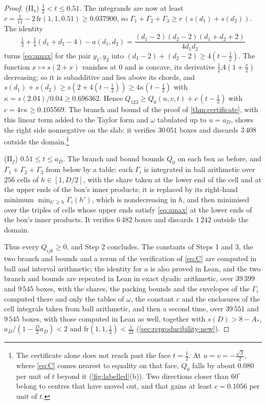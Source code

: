 \documentclass[11pt,reqno]{amsart}
\renewcommand{\_}{\origunderscore\allowbreak}
\numberwithin{equation}{section}
\theoremstyle{plain}
\theoremstyle{definition}
\theoremstyle{remark}
\begin{document}
\begin{proof}
(II$_s$) $\frac12<t\le0.51$. The integrands are now at least
$r=\frac1{11}-2\,\mathrm{fr}(1,1,0.51)\ge0.037900$, so
$\Gamma_1+\Gamma_2+\Gamma_3\ge r\,(s(d_1)+s(d_2))$. The identity
\[
  \tfrac12+\tfrac14(d_1+d_2-4)-a(d_1,d_2)
  =\frac{(d_1-2)(d_2-2)(d_1+d_2+2)}{4d_1d_2}
\]
turns \eqref{eq:amax} for the pair $y_1,y_2$ into
$(d_1-2)+(d_2-2)\ge4(t-\frac12)$. The function $x\mapsto s(2+x)$
vanishes at $0$ and is concave, its derivative $\frac12A(1+\frac x2)$
decreasing; so it is subadditive and lies above its chords, and
$s(d_1)+s(d_2)\ge s(2+4(t-\frac12))\ge4\kappa(t-\frac12)$ with
$\kappa=s(2.04)/0.04\ge0.696362$. Hence
$Q_{123}\ge Q_0(u,v,t)+c\,(t-\frac12)$ with $c=4r\kappa\ge0.105569$. The
branch and bound of the proof of \cref{thm:certificate}, with this linear
term added to the Taylor form and $\omega$ tabulated up to $u=a_D$, shows
the right side nonnegative on the slab: it verifies $30\,051$ boxes and
discards $3\,408$ outside the domain.\footnote{The certificate alone
does not reach past the face $t=\frac12$. At $u=v=-\frac{\sqrt3}2$, where
\eqref{eq:C} comes nearest to equality on that face, $Q_0$ falls by
about $0.080$ per unit of $t$ beyond it (\cref{fig:labelled}(b)). Two
directions closer than $60^\circ$ belong to centres that have moved out,
and that gains at least $c=0.1056$ per unit of $t$.}

(II$_f$) $0.51\le t\le a_D$. The branch and bound bounds $Q_0$ on each
box as before, and $\Gamma_1+\Gamma_2+\Gamma_3$ from below by a table:
each $\Gamma_i$ is integrated in ball arithmetic over $256$ cells of
$h\in[1,D/2]$, with the share taken at the lower end of the cell and at
the upper ends of the box's inner products; it is replaced by its
right-hand minimum $\min_{h'\ge h}\Gamma_i(h')$, which is nondecreasing
in $h$, and then minimised over the triples of cells whose upper ends
satisfy \eqref{eq:amax} at the lower ends of the box's inner products.
It verifies $6\,482$ boxes and discards $1\,242$ outside the domain.

Thus every $Q_{ijk}\ge0$, and Step 2 concludes. The constants of Steps 1
and 3, the two branch and bounds and a rerun of the verification of
\eqref{eq:C} are computed in ball and interval arithmetic; the identity
for $a$ is also proved in Lean, and the two
branch and bounds are repeated in Lean in exact dyadic arithmetic, over
$39\,399$ and $9\,545$ boxes, with the shares, the packing bounds and the
envelopes of the $\Gamma_i$ computed there and only the tables of $\omega$,
the constant $c$ and the enclosures of the cell integrals taken from ball
arithmetic, and then a second time, over $39\,551$ and $9\,545$ boxes, with
those computed in Lean as well, together with $s(D)>8-A_*$, $a_D/(1-\frac D2a_D)<2$ and $\mathrm{fr}(1,1,\frac12)<\frac1{22}$
(\cref{sec:reproducibility-new}).
\end{proof}
\end{document}
